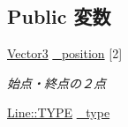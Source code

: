 \subsection*{Public 変数}
\begin{DoxyCompactItemize}
\item 
\hyperlink{struct_vector3}{Vector3} \hyperlink{struct_line_af3c45cc53927ae76abe807ec32bd181d}{\-\_\-position} \mbox{[}2\mbox{]}
\begin{DoxyCompactList}\small\item\em 始点・終点の２点 \end{DoxyCompactList}\item 
\hyperlink{struct_line_a3ccf0fa7d4f1e4b84271568934a65191}{Line\-::\-T\-Y\-P\-E} \hyperlink{struct_line_ac6d9b4fc1370daa00c4bcd22d6e33a05}{\-\_\-type}
\end{DoxyCompactItemize}


